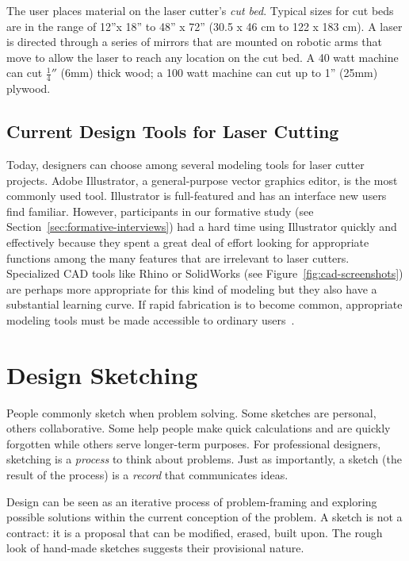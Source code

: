 The user places material on the laser cutter's \textit{cut
  bed}. Typical sizes for cut beds are in the range of 12''x 18'' to
48'' x 72'' (30.5 x 46 cm to 122 x 183 cm). A laser is directed
through a series of mirrors that are mounted on robotic arms that move
to allow the laser to reach any location on the cut bed. A 40 watt
machine can cut $\frac{1}{4}''$ (6mm) thick wood; a 100 watt machine
can cut up to 1'' (25mm) plywood.

\subsection{Current Design Tools for Laser Cutting}

Today, designers can choose among several modeling tools for laser
cutter projects. Adobe Illustrator, a general-purpose vector graphics
editor, is the most commonly used tool. Illustrator is full-featured
and has an interface new users find familiar. However, participants in
our formative study (see Section~\ref{sec:formative-interviews}) had a
hard time using Illustrator quickly and effectively because they spent
a great deal of effort looking for appropriate functions among the
many features that are irrelevant to laser cutters. Specialized CAD
tools like Rhino or SolidWorks (see Figure~\ref{fig:cad-screenshots})
are perhaps more appropriate for this kind of modeling but they also
have a substantial learning curve. If rapid fabrication is to become
common, appropriate modeling tools must be made accessible to ordinary
users~\cite{lipson-homefactory}.



\section{Design Sketching}

People commonly sketch when problem solving. Some sketches are
personal, others collaborative. Some help people make quick
calculations and are quickly forgotten while others serve longer-term
purposes. For professional designers, sketching is a \textit{process}
to think about problems. Just as importantly, a sketch (the result of
the process) is a \textit{record} that communicates ideas. 

Design can be seen as an iterative process of problem-framing and
exploring possible solutions within the current conception of the
problem. A sketch is not a contract: it is a proposal that can be
modified, erased, built upon. The rough look of hand-made sketches
suggests their provisional nature.

